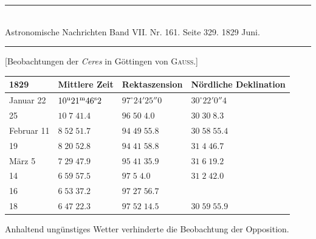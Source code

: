 \clearpage
{}
\begin{center}
\rule{0.55\linewidth}{0.4pt}\\[2pt]
Astronomische Nachrichten Band VII. Nr. 161. Seite 329. 1829 Juni.\\[2pt]
\rule{0.55\linewidth}{0.4pt}
\end{center}

\begin{center}[Beobachtungen der \emph{Ceres} in Göttingen von \textsc{Gauss.}]\end{center}

\begin{center}
\begin{tabular}{l|l|l|l}
1829 & Mittlere Zeit & Rektaszension & Nördliche Deklination \\
\hline
Januar 22 & $10^{\rm u}21^{\rm m}46^{\rm s}2$ & $97^\circ24'25''0$ & $30^\circ22'0''4$ \\
\hfill 25 & $10\;7\;41.4$ & $96\;50\;4.0$ & $30\;30\;8.3$ \\
Februar 11 & $8\;52\;51.7$ & $94\;49\;55.8$ & $30\;58\;55.4$ \\
\hfill 19 & $8\;20\;52.8$ & $94\;41\;58.8$ & $31\;4\;46.7$ \\
März 5 & $7\;29\;47.9$ & $95\;41\;35.9$ & $31\;6\;19.2$ \\
\hfill 14 & $6\;59\;57.5$ & $97\;5\;4.0$ & $31\;2\;42.0$ \\
\hfill 16 & $6\;53\;37.2$ & $97\;27\;56.7$ & \\
\hfill 18 & $6\;47\;22.3$ & $97\;52\;14.5$ & $30\;59\;55.9$ \\
\end{tabular}
\end{center}

Anhaltend ungünstiges Wetter verhinderte die Beobachtung der Opposition.

